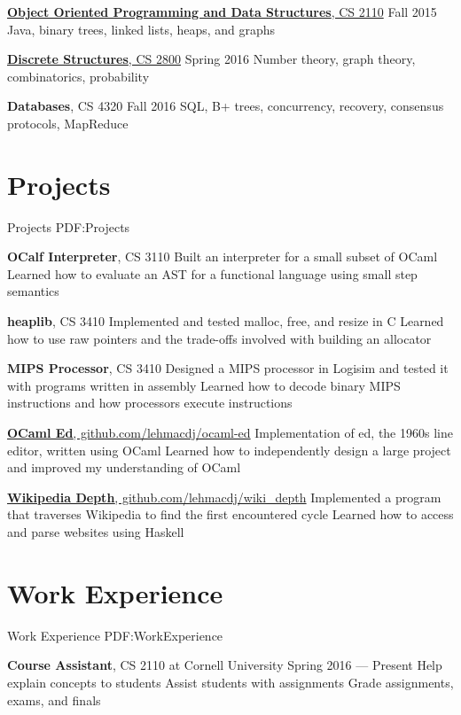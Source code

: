 \documentclass[letterpaper,10pt,oneside]{simpleresume}
\begin{document}
\begin{minipage}[t][0pt]{\linewidth}
\begin{body}
\href{https://www.cs.cornell.edu/courses/cs2110/2015fa/}
{\textbf{Object Oriented Programming and Data Structures}, CS 2110}
\hfill Fall 2015
\BulletItem%
Java, binary trees, linked lists, heaps, and graphs

\href{https://www.cs.cornell.edu/courses/cs2800/2016sp/}
{\textbf{Discrete Structures}, CS 2800}
\hfill Spring 2016
\BulletItem%
Number theory, graph theory, combinatorics, probability

\textbf{Databases}, CS 4320
\hfill Fall 2016
\BulletItem%
SQL, B+ trees, concurrency, recovery, consensus protocols, MapReduce

\section%
{Projects}
{Projects}
{PDF:Projects}

\textbf{OCalf Interpreter}, CS 3110
\BulletItem%
Built an interpreter for a small subset of OCaml
\BulletItem%
Learned how to evaluate an AST for a functional language using small step
semantics

\textbf{heaplib}, CS 3410
\BulletItem%
Implemented and tested malloc, free, and resize in C
\BulletItem%
Learned how to use raw pointers and the trade-offs involved with building
an allocator

\textbf{MIPS Processor}, CS 3410
\BulletItem%
Designed a MIPS processor in Logisim and tested it with programs written in
assembly
\BulletItem%
Learned how to decode binary MIPS instructions and how processors execute
instructions

\href{https://www.github.com/lehmacdj/ocaml-ed}
{\textbf{OCaml Ed}, github.com/lehmacdj/ocaml-ed}
\BulletItem%
Implementation of ed, the 1960s line editor, written using OCaml
\BulletItem%
Learned how to independently design a large project and improved my
understanding of OCaml

\href{https://www.github.com/lehmacdj/wiki_depth}
{\textbf{Wikipedia Depth}, github.com/lehmacdj/wiki\_depth}
\BulletItem%
Implemented a program that traverses Wikipedia to find the first encountered
cycle
\BulletItem%
Learned how to access and parse websites using Haskell

\section%
{Work Experience}
{Work Experience}
{PDF:WorkExperience}

\textbf{Course Assistant}, CS 2110 at Cornell University
\hfill
Spring 2016 --- Present
\BulletItem%
Help explain concepts to students
\BulletItem%
Assist students with assignments
\BulletItem%
Grade assignments, exams, and finals


\end{body}
\end{minipage}
\end{document}
